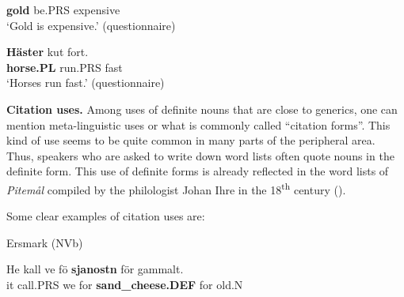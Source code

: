 \textbf{gold} be.PRS  expensive\\

\glt ‘Gold is expensive.’ (questionnaire)

\z

\item 


 \ea\label{}
\gll \textbf{Häster} kut  fort.\\


\textbf{horse.PL} run.PRS  fast\\

\glt ‘Horses run fast.’ (questionnaire)

\z

\textbf{Citation uses.} Among uses of definite nouns that are close to generics, one can mention meta-linguistic uses or what is commonly called “citation forms”. This kind of use seems to be quite common in many parts of the peripheral area. Thus, speakers who are asked to write down word lists often quote nouns in the definite form. This use of definite forms is already reflected in the word lists of \textit{Pitemål} compiled by the philologist Johan Ihre in the 18\textsuperscript{th} century (\citet{Reinhammar2002}). 


Some clear examples of citation uses are:


\item 

Ersmark (NVb) 



 \ea\label{}
\gll He  kall  ve  fö  \textbf{sjanostn} för  gammalt.\\


it  call.PRS  we  for  \textbf{sand\_cheese.DEF} for  old.N\\

